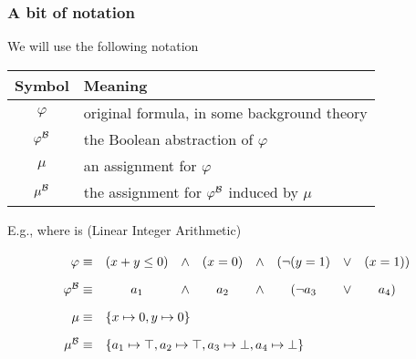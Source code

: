 \begin{frame}
  \frametitle{A bit of notation}

  \scriptsize

  We will use the following notation
  \vfill
  \begin{center}
  \begin{tabular}{cl}
  \hline
  Symbol            & Meaning \\
  \hline
  $\varphi$         & original formula, in some background theory \T \\
  $\varphi^{\mathcal{B}}$ & the Boolean abstraction of $\varphi$ \\
  $\mu$             & an assignment for $\varphi$ \\
  $\mu^{\mathcal{B}}$     & the assignment for $\varphi^{\mathcal{B}}$ induced by $\mu$ \\
  \hline
  \end{tabular}
  \end{center}
  \vfill
  \pause
  E.g., where \T is \Lia (Linear Integer Arithmetic)
  $$
  \ra{1.8} 
  \begin{array}{rccccccc}
    \varphi \equiv         & (x + y \leq 0) & \wedge & (x = 0) & \wedge & (\neg (y = 1) & \vee & (x = 1) ) \\
    \babst{\varphi} \equiv & a_1            & \wedge & a_2     & \wedge & (\neg a_3 & \vee & a_4     ) \\ 
    \mu     \equiv         & \multicolumn{7}{l}{\{ x \mapsto 0, y \mapsto 0 \}}       \\
    \babst{\mu} \equiv     & \multicolumn{7}{l}{\{ a_1 \mapsto \top, a_2 \mapsto \top, a_3 \mapsto \bot, a_4 \mapsto \bot \}}
  \end{array}
  $$

\end{frame}

